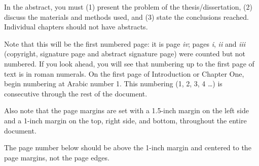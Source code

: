 \abstract
In the abstract, you must (1) present the problem of the thesis/dissertation, (2) discuss the materials and methods used, and (3) state the conclusions reached. Individual chapters should not have abstracts.
 
Note that this will be the first numbered page: it is page \textit{iv}; pages \textit{i}, \textit{ii} and \textit{iii} (copyright, signature page and abstract signature page) were counted but not numbered. If you look ahead, you will see that numbering up to the first page of text is in roman numerals. On the first page of Introduction or Chapter One, begin numbering at Arabic number 1. This numbering (1, 2, 3, 4 \dots) is consecutive through the rest of the document. 

Also note that the page margins are set with a 1.5-inch margin on the left side and a 1-inch margin on the top, right side, and bottom, throughout the entire document.

The page number below should be above the 1-inch margin and centered to the page margins, not the page edges.
